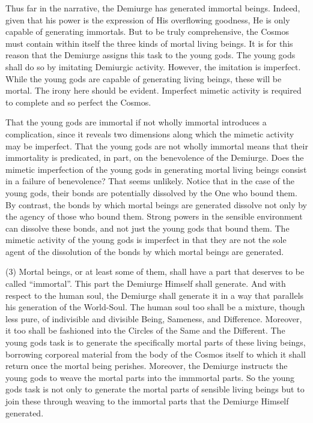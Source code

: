 Thus far in the narrative, the Demiurge has generated immortal beings. Indeed, given that his power is the expression of His overflowing goodness, He is only capable of generating immortals. But to be truly comprehensive, the Cosmos must contain within itself the three kinds of mortal living beings. It is for this reason that the Demiurge assigns this task to the young gods. The young gods shall do so by imitating Demiurgic activity. However, the imitation is imperfect. While the young gods are capable of generating living beings, these will be mortal. The irony here should be evident. Imperfect mimetic activity is required to complete and so perfect the Cosmos.

That the young gods are immortal if not wholly immortal introduces a complication, since it reveals two dimensions along which the mimetic activity may be imperfect. That the young gods are not wholly immortal means that their immortality is predicated, in part, on the benevolence of the Demiurge. Does the mimetic imperfection of the young gods in generating mortal living beings consist in a failure of benevolence? That seems unlikely. Notice that in the case of the young gods, their bonds are potentially dissolved by the One who bound them. By contrast, the bonds by which mortal beings are generated dissolve not only by the agency of those who bound them. Strong powers in the sensible environment can dissolve these bonds, and not just the young gods that bound them. The mimetic activity of the young gods is imperfect in that they are not the sole agent of the dissolution of the bonds by which mortal beings are generated.

(3) Mortal beings, or at least some of them, shall have a part that deserves to be called ``immortal''. This part the Demiurge Himself shall generate. And with respect to the human soul, the Demiurge shall generate it in a way that parallels his generation of the World-Soul. The human soul too shall be a mixture, though less pure, of indivisible and divisible Being, Sameness, and Difference. Moreover, it too shall be fashioned into the Circles of the Same and the Different. The young gods task is to generate the specifically mortal parts of these living beings, borrowing corporeal material from the body of the Cosmos itself to which it shall return once the mortal being perishes. Moreover, the Demiurge instructs the young gods to weave the mortal parts into the immmortal parts. So the young gods task is not only to generate the mortal parts of sensible living beings but to join these through weaving to the immortal parts that the Demiurge Himself generated.

